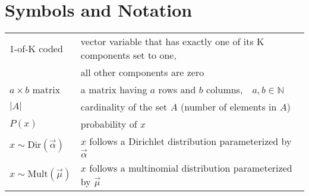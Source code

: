 \section*{Symbols and Notation}

\begin{tabular}{ll}
1-of-K coded & vector variable that has exactly one of its K components set to one,\\ & all other components are zero\\
$a \times b$ matrix & a matrix having $a$ rows and $b$ columns,\ \ $a, b \in \mathbb{N}$\\
$|A|$ & cardinality of the set $A$ (number of elements in $A$)\\
$P(x)$ & probability of $x$\\
$x \sim \text{Dir}(\vec \alpha)$ & $x$ follows a Dirichlet distribution parameterized by $\vec \alpha$\\
$x \sim \text{Mult}(\vec \mu)$ & $x$ follows a multinomial distribution parameterized by $\vec \mu$
\end{tabular}
